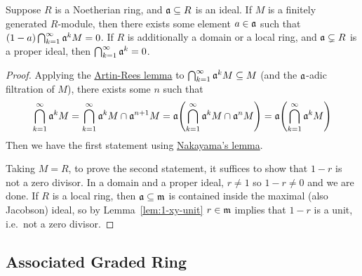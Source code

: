 \begin{theorem}
    Suppose \(R\) is a Noetherian ring, and \(\mathfrak{a} \subseteq R\) is an ideal.
    If \(M\) is a finitely generated \(R\)-module,
    then there exists some element \(a \in \mathfrak{a}\) such that
    \((1-a)\bigcap_{k=1}^\infty \mathfrak{a}^k M = 0\).
    If \(R\) is additionally a domain or a local ring, and \(\mathfrak{a} \subsetneq R\) is a proper ideal,
    then \(\bigcap_{k=1}^\infty \mathfrak{a}^k = 0\).
\end{theorem}
\begin{proof}
    Applying the \hyperref[prop:artin-rees]{Artin-Rees lemma}
    to \(\bigcap_{k=1}^\infty \mathfrak{a}^k M \subseteq M\) (and the \(\mathfrak{a}\)-adic filtration of \(M\)),
    there exists some \(n\) such that
    \begin{equation*}
        \bigcap_{k=1}^\infty \mfk{a}^k M = \bigcap_{k=1}^\infty \mfk{a}^k M \cap \mfk{a}^{n+1} M
        = \mfk{a}\pqty{\bigcap_{k=1}^\infty \mfk{a}^k M \cap \mfk{a}^n M}
        = \mfk{a}\pqty{\bigcap_{k=1}^\infty \mfk{a}^k M}
    \end{equation*}
    Then we have the first statement using \hyperref[cor:nakayama]{Nakayama's lemma}.

    Taking \(M = R\), to prove the second statement,
    it suffices to show that \(1-r\) is not a zero divisor.
    In a domain and a proper ideal, \(r \neq 1\) so \(1-r \neq 0\) and we are done.
    If \(R\) is a local ring, then \(\mathfrak{a} \subseteq \mathfrak{m}\) is contained inside the maximal (also Jacobson) ideal,
    so by Lemma~\ref{lem:1-xy-unit} \(r \in \mathfrak{m}\) implies that \(1-r\) is a unit,
    i.e.\ not a zero divisor.
\end{proof}

\subsection*{Associated Graded Ring}

